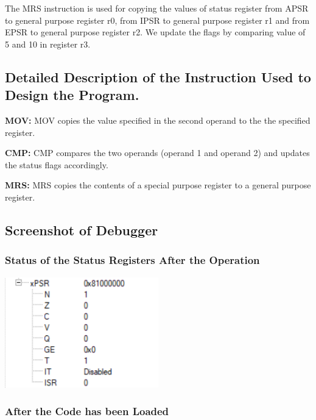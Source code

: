 \documentclass{article}
\begin{document}
The MRS instruction is used for copying the values of status register from APSR to general purpose register r0, from IPSR to general purpose register r1 and from EPSR to general purpose register r2. We update the flags by comparing value of 5 and 10 in register r3.

\subsection{Detailed Description of the Instruction Used to Design the Program.}

\item \textbf{MOV: }MOV copies the value specified in the second operand to the the specified register.
\item \textbf{CMP: }CMP compares the two operands (operand 1 and operand 2) and updates the status flags accordingly.
\item \textbf{MRS: }MRS copies the contents of a special purpose register to a general purpose register.

\subsection{Screenshot of Debugger}

\subsubsection{Status of the Status Registers After the Operation}

\begin{center}
    \includegraphics[width=0.5\textwidth]{task_ii_PSR.png}
\end{center}

\subsubsection{After the Code has been Loaded}
\end{document}
